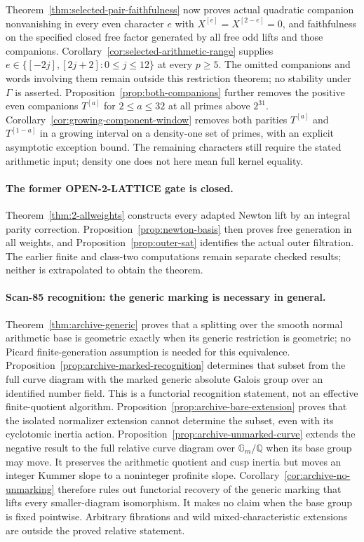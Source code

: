 \documentclass[11pt,a4paper]{article}
\theoremstyle{definition}
\begin{document}
Theorem~\ref{thm:selected-pair-faithfulness} now proves actual
quadratic companion nonvanishing in every even character $e$ with
$X^{[e]}=X^{[2-e]}=0$, and faithfulness on the specified closed free
factor generated by all free odd lifts and those companions.
Corollary~\ref{cor:selected-arithmetic-range} supplies
$e\in\{[-2j],[2j+2]:0\leq j\leq12\}$ at every $p\geq5$.
The omitted companions and words involving them remain outside this
restriction theorem; no stability under $\Gamma$ is asserted.
Proposition~\ref{prop:both-companions} further removes the positive
even companions $T^{[a]}$ for $2\leq a\leq32$ at all primes above
$2^{31}$. Corollary~\ref{cor:growing-component-window} removes both
parities $T^{[a]}$ and $T^{[1-a]}$ in a growing interval on a
density-one set of primes, with an explicit asymptotic exception
bound. The remaining characters still require the stated arithmetic
input; density one does not here mean full kernel equality.

\paragraph{The former OPEN-2-LATTICE gate is closed.}
Theorem~\ref{thm:2-allweights} constructs every adapted Newton lift
by an integral parity correction. Proposition~\ref{prop:newton-basis}
then proves free generation in all weights, and
Proposition~\ref{prop:outer-sat} identifies the actual outer filtration.
The earlier finite and class-two computations remain separate checked
results; neither is extrapolated to obtain the theorem.

\paragraph{Scan-85 recognition: the generic marking is necessary in general.}
Theorem~\ref{thm:archive-generic} proves that a splitting over the
smooth normal arithmetic base is geometric exactly when its generic
restriction is geometric; no Picard finite-generation assumption is
needed for this equivalence.
Proposition~\ref{prop:archive-marked-recognition} determines that
subset from the full curve diagram with the marked generic absolute
Galois group over an identified number field. This is a functorial
recognition statement, not an effective finite-quotient algorithm.
Proposition~\ref{prop:archive-bare-extension} proves that the isolated
normalizer extension cannot determine the subset, even with its
cyclotomic inertia action. Proposition~\ref{prop:archive-unmarked-curve}
extends the negative result to the full relative curve diagram over
$\mathbb G_m/\mathbb Q$ when its base group may move. It preserves
the arithmetic quotient and cusp inertia but moves an integer Kummer
slope to a noninteger profinite slope.
Corollary~\ref{cor:archive-no-unmarking} therefore rules out functorial
recovery of the generic marking that lifts every smaller-diagram
isomorphism. It makes no claim when the base group is fixed pointwise.
Arbitrary
fibrations and wild mixed-characteristic extensions are outside the
proved relative statement.
\end{document}
